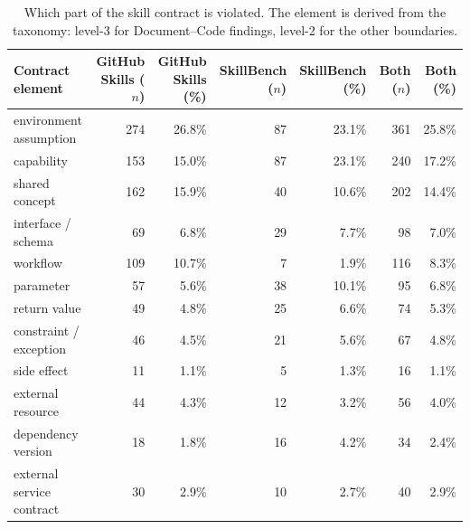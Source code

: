 \begin{table}[t]
  \centering
  \caption{Which part of the skill contract is violated. The element is derived from the taxonomy: level-3 for Document--Code findings, level-2 for the other boundaries.}
  \label{tab:rq1-facet}
  \small
  \setlength{\tabcolsep}{4pt}

  \begin{tabular}{lrrrrrr}
    \toprule
    Contract element & \makecell{GitHub Skills\\($n$)} & \makecell{GitHub Skills\\(\%)} & \makecell{SkillBench\\($n$)} & \makecell{SkillBench\\(\%)} & \makecell{Both\\($n$)} & \makecell{Both\\(\%)} \\
    \midrule
    environment assumption & 274 & 26.8\% & 87 & 23.1\% & 361 & 25.8\% \\
    capability & 153 & 15.0\% & 87 & 23.1\% & 240 & 17.2\% \\
    shared concept & 162 & 15.9\% & 40 & 10.6\% & 202 & 14.4\% \\
    interface / schema & 69 & 6.8\% & 29 & 7.7\% & 98 & 7.0\% \\
    workflow & 109 & 10.7\% & 7 & 1.9\% & 116 & 8.3\% \\
    parameter & 57 & 5.6\% & 38 & 10.1\% & 95 & 6.8\% \\
    return value & 49 & 4.8\% & 25 & 6.6\% & 74 & 5.3\% \\
    constraint / exception & 46 & 4.5\% & 21 & 5.6\% & 67 & 4.8\% \\
    side effect & 11 & 1.1\% & 5 & 1.3\% & 16 & 1.1\% \\
    external resource & 44 & 4.3\% & 12 & 3.2\% & 56 & 4.0\% \\
    dependency version & 18 & 1.8\% & 16 & 4.2\% & 34 & 2.4\% \\
    external service contract & 30 & 2.9\% & 10 & 2.7\% & 40 & 2.9\% \\
    \bottomrule
  \end{tabular}
\end{table}
